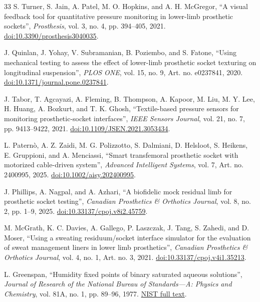 \begin{thebibliography}{33}
S. Turner, S. Jain, A. Patel, M. O. Hopkins, and A. H. McGregor,
\textquotedblleft A visual feedback tool for quantitative pressure monitoring
in lower-limb prosthetic sockets\textquotedblright,
\textit{Prosthesis}, vol. 3, no. 4, pp. 394--405, 2021.
\href{https://doi.org/10.3390/prosthesis3040035}
{doi:10.3390/prosthesis3040035}.

J. Quinlan, J. Yohay, V. Subramanian, B. Poziembo, and S. Fatone,
\textquotedblleft Using mechanical testing to assess the effect of lower-limb
prosthetic socket texturing on longitudinal suspension\textquotedblright,
\textit{PLOS ONE}, vol. 15, no. 9, Art. no. e0237841, 2020.
\href{https://doi.org/10.1371/journal.pone.0237841}
{doi:10.1371/journal.pone.0237841}.

J. Tabor, T. Agcayazi, A. Fleming, B. Thompson, A. Kapoor, M. Liu,
M. Y. Lee, H. Huang, A. Bozkurt, and T. K. Ghosh,
\textquotedblleft Textile-based pressure sensors for monitoring
prosthetic-socket interfaces\textquotedblright,
\textit{IEEE Sensors Journal}, vol. 21, no. 7, pp. 9413--9422, 2021.
\href{https://doi.org/10.1109/JSEN.2021.3053434}
{doi:10.1109/JSEN.2021.3053434}.

L. Patern\`o, A. Z. Zaidi, M. G. Polizzotto, S. Dalmiani, D. Helsloot,
S. Heikens, E. Gruppioni, and A. Menciassi,
\textquotedblleft Smart transfemoral prosthetic socket with motorized
cable-driven system\textquotedblright,
\textit{Advanced Intelligent Systems}, vol. 7, Art. no. 2400995, 2025.
\href{https://doi.org/10.1002/aisy.202400995}
{doi:10.1002/aisy.202400995}.

J. Phillips, A. Nagpal, and A. Azhari,
\textquotedblleft A biofidelic mock residual limb for prosthetic socket
testing\textquotedblright,
\textit{Canadian Prosthetics \& Orthotics Journal}, vol. 8, no. 2,
pp. 1--9, 2025.
\href{https://doi.org/10.33137/cpoj.v8i2.45759}
{doi:10.33137/cpoj.v8i2.45759}.

M. McGrath, K. C. Davies, A. Gallego, P. Laszczak, J. Tang, S. Zahedi,
and D. Moser,
\textquotedblleft Using a sweating residuum/socket interface simulator for the
evaluation of sweat management liners in lower limb prosthetics\textquotedblright,
\textit{Canadian Prosthetics \& Orthotics Journal}, vol. 4, no. 1,
Art. no. 3, 2021.
\href{https://doi.org/10.33137/cpoj.v4i1.35213}
{doi:10.33137/cpoj.v4i1.35213}.

L. Greenspan,
\textquotedblleft Humidity fixed points of binary saturated aqueous
solutions\textquotedblright,
\textit{Journal of Research of the National Bureau of Standards---A: Physics
and Chemistry}, vol. 81A, no. 1, pp. 89--96, 1977.
\href{https://nvlpubs.nist.gov/nistpubs/jres/81A/jresv81An1p89_A1b.pdf}
{NIST full text}.


\end{thebibliography}
